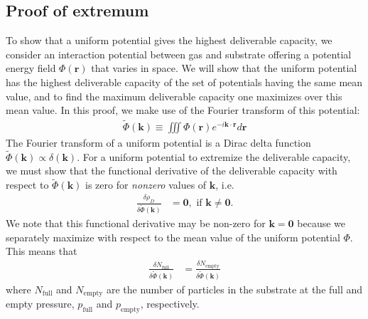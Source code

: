 \documentclass[twoside,twocolumn,9pt]{article}
\newcommand{\rvec}{\mathbf{r}}
\newcommand{\kvec}{\mathbf{k}}
\newcommand\V{\Phi}
\newcommand\Vk{\tilde\Phi(\kvec)}
\newcommand\pfull{\ensuremath{p_{\text{full}}}}
\newcommand\pempty{\ensuremath{p_{\text{empty}}}}
\begin{document}
\subsection{Proof of extremum}\label{sec:proof-extremum}

To show that a uniform potential gives the highest deliverable capacity, we
consider an interaction potential between gas and substrate offering a
potential energy field $\V(\rvec)$ that varies in space. We will show that the
uniform potential has the highest deliverable capacity of the set of potentials
having the same mean value, and to find the maximum deliverable capacity one
maximizes over this mean value. In this proof, we make use of the Fourier
transform of this potential:
\begin{align}
    \Vk \equiv \iiint \V(\rvec) e^{-i\kvec\cdot \rvec} d\rvec
\end{align}
The Fourier transform of a uniform potential is a Dirac delta function
$\tilde{\V}(\kvec)\propto\delta(\kvec)$. For a uniform potential to extremize
the deliverable capacity, we must show that the functional derivative of the
deliverable capacity with respect to $\Vk$ is zero for \emph{nonzero} values of
$\kvec$, i.e.
\begin{align}
    \frac{\delta \rho_D}{\delta \Vk} &= \mathbf{0}, \text{ if } \kvec\ne \mathbf{0}.
\end{align}
We note that this functional derivative may be non-zero for $\kvec=\mathbf{0}$
because we separately maximize with respect to the mean value of the uniform
potential $\V$. This means that
\begin{align}
    \frac{\delta N_\text{full}}{\delta \Vk} &= \frac{\delta N_\text{empty}}{\delta \Vk}
\end{align}
where $N_\text{full}$ and $N_\text{empty}$ are the number of particles in the
substrate at the full and empty pressure, $\pfull$ and $\pempty$, respectively.
\end{document}
